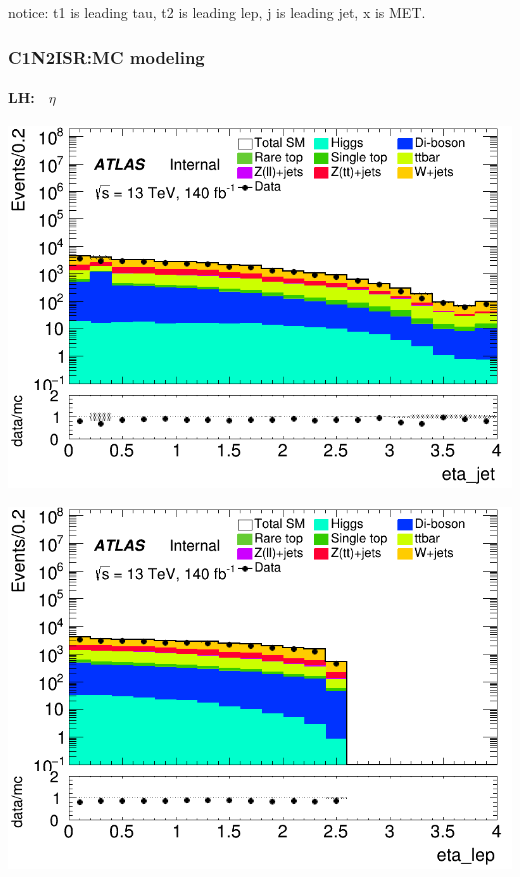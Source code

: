 \documentclass[usenames,dvipsnames]{beamer}
\begin{document}
\begin{frame}
\begin{minipage}{0.32\textwidth}
    \end{minipage}
    notice: t1 is leading tau, t2 is leading lep, j is leading jet, x is MET.
\end{frame}

\begin{frame}
\frametitle{C1N2ISR:MC modeling}
\framesubtitle{LH:$\quad\eta$}
    \begin{minipage}{0.32\textwidth}
        \centering
        \includegraphics[width=\textwidth]{graphics/LH_met/LH_met_eta_jet.png}
    \end{minipage}
    \hfill
    \begin{minipage}{0.32\textwidth}
        \centering
        \includegraphics[width=\textwidth]{graphics/LH_met/LH_met_eta_lep.png}
    \end{minipage}

\end{frame}
\end{document}
